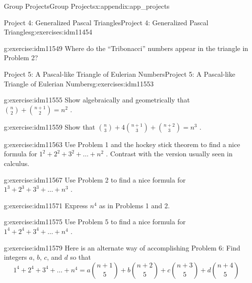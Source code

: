 \documentclass[oneside,10pt,]{book}
\numberwithin{equation}{chapter}
\begin{document}
\begin{appendixptx}{Group Projects}{}{Group Projects}{}{}{x:appendix:app_projects}
\begin{exercises-section-numberless}{Project 4: Generalized Pascal Triangles}{}{Project 4: Generalized Pascal Triangles}{}{}{g:exercises:idm11454}
\begin{divisionexercise}{8}{}{}{g:exercise:idm11549}%
Where do the ``Tribonacci'' numbers appear in the triangle in Problem 2?%
\end{divisionexercise}%
\end{exercises-section-numberless}
%
%
\typeout{************************************************}
\typeout{************************************************}
%
\begin{exercises-section-numberless}{Project 5: A Pascal-like Triangle of Eulerian Numbers}{}{Project 5: A Pascal-like Triangle of Eulerian Numbers}{}{}{g:exercises:idm11553}
\begin{divisionexercise}{1}{}{}{g:exercise:idm11555}%
Show algebraically and geometrically that \(\binom{n}{2}
+
\binom{n + 1}{2}
= n^{2}\) .%
\end{divisionexercise}%
\begin{divisionexercise}{2}{}{}{g:exercise:idm11559}%
Show that \(\binom{n}{3}
+ 4
\binom{n + 1}{3}
+
\binom{n + 2}{3}
= n^{3}\) .%
\end{divisionexercise}%
\begin{divisionexercise}{3}{}{}{g:exercise:idm11563}%
Use Problem 1 and the hockey stick theorem to find a nice formula for \(1^{2} + 2^{2} + 3^{2} + \ldots + n^{2}\) . Contrast with the version usually seen in calculus.%
\end{divisionexercise}%
\begin{divisionexercise}{4}{}{}{g:exercise:idm11567}%
Use Problem 2 to find a nice formula for \(1^{3} + 2^{3} + 3^{3} + \ldots + n^{3}\) .%
\end{divisionexercise}%
\begin{divisionexercise}{5}{}{}{g:exercise:idm11571}%
Express \(n^{4}\) as in Problems 1 and 2.%
\end{divisionexercise}%
\begin{divisionexercise}{6}{}{}{g:exercise:idm11575}%
Use Problem 5 to find a nice formula for \(1^{4} + 2^{4} + 3^{4} + \ldots + n^{4}\) .%
\end{divisionexercise}%
\begin{divisionexercise}{7}{}{}{g:exercise:idm11579}%
Here is an alternate way of accomplishing Problem 6:  Find integers \(a\), \(b\), \(c\), and \(d\) so that%
\begin{equation*}
1^{4} + 2^{4} + 3^{4} + \ldots + n^{4} = a\binom{n + 1}{5}  + b\binom{n + 2}{5}  + c\binom{n + 3}{5}  + d\binom{n + 4}{5}

\end{equation*}
\end{divisionexercise}
\end{exercises-section-numberless}
\end{appendixptx}
\end{document}
